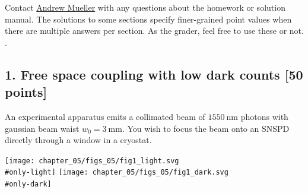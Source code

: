 \documentclass[12pt]{caltech_thesis}
\begin{document}
{\color{midnightblue} Contact
\href{mailto:andrewstermueller@gmail.com}{Andrew Mueller} with any
questions about the homework or solution manual. The solutions to some
sections specify finer-grained point values when there are multiple
answers per section. As the grader, feel free to use these or not. }.

\hypertarget{free-space-coupling-with-low-dark-counts-50-points}{%
\subsection{1. Free space coupling with low dark counts {[}50
points{]}}\label{free-space-coupling-with-low-dark-counts-50-points}}

An experimental apparatus emits a collimated beam of
\(1550~\mathrm{nm}\) photons with gaussian beam waist
\(w_0 = 3~\mathrm{mm}\). You wish to focus the beam onto an SNSPD
directly through a window in a cryostat.

\texttt{[image: chapter\_05/figs\_05/fig1\_light.svg\\\#only-light]}
\texttt{[image: chapter\_05/figs\_05/fig1\_dark.svg\\\#only-dark]}

\printbibliography
\end{document}
